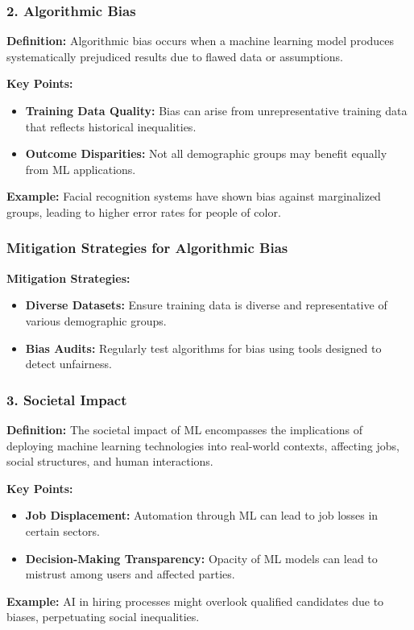 \documentclass[aspectratio=169]{beamer}
\begin{document}
\begin{frame}[fragile]
    \frametitle{2. Algorithmic Bias}
    \textbf{Definition:} Algorithmic bias occurs when a machine learning model produces systematically prejudiced results due to flawed data or assumptions.

    \textbf{Key Points:}
    \begin{itemize}
        \item \textbf{Training Data Quality:} Bias can arise from unrepresentative training data that reflects historical inequalities.
        \item \textbf{Outcome Disparities:} Not all demographic groups may benefit equally from ML applications.
    \end{itemize}

    \textbf{Example:} Facial recognition systems have shown bias against marginalized groups, leading to higher error rates for people of color.
\end{frame}

\begin{frame}[fragile]
    \frametitle{Mitigation Strategies for Algorithmic Bias}
    \textbf{Mitigation Strategies:}
    \begin{itemize}
        \item \textbf{Diverse Datasets:} Ensure training data is diverse and representative of various demographic groups.
        \item \textbf{Bias Audits:} Regularly test algorithms for bias using tools designed to detect unfairness.
    \end{itemize}
\end{frame}

\begin{frame}[fragile]
    \frametitle{3. Societal Impact}
    \textbf{Definition:} The societal impact of ML encompasses the implications of deploying machine learning technologies into real-world contexts, affecting jobs, social structures, and human interactions.

    \textbf{Key Points:}
    \begin{itemize}
        \item \textbf{Job Displacement:} Automation through ML can lead to job losses in certain sectors.
        \item \textbf{Decision-Making Transparency:} Opacity of ML models can lead to mistrust among users and affected parties.
    \end{itemize}

    \textbf{Example:} AI in hiring processes might overlook qualified candidates due to biases, perpetuating social inequalities.
\end{frame}
\end{document}

